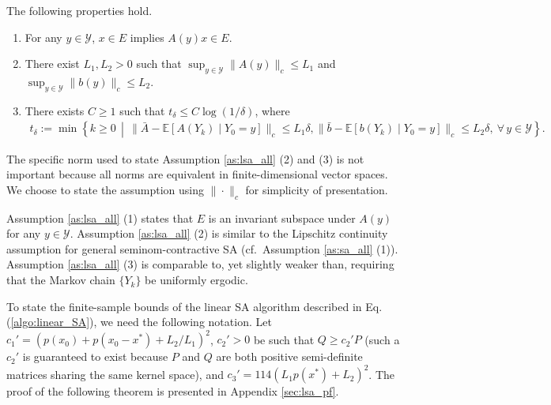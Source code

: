 \documentclass[11 pt]{article}
\begin{document}
	
	\begin{assumption}\label{as:lsa_all}
		The following properties hold.
		\begin{enumerate}[(1)]
			\item For any $y\in\mathcal{Y}$, $x\in E$ implies $A(y)x\in E$.
			\item There exist $L_1,L_2>0$ such that $\sup_{y\in\mathcal{Y}}\|A(y)\|_c\leq L_1$ and $\sup_{y\in\mathcal{Y}}\|b(y)\|_c\leq L_2$.
			\item There exists $C \geq 1$ such that $t_\delta \leq C \log(1/\delta)$, where
			\begin{align*}  
				t_\delta := \min\left\{k \geq 0 \,\middle|\, \|\bar{A} - \mathbb{E}[A(Y_k) \mid Y_0=y]\|_c \leq L_1\delta, \|\bar{b}-\mathbb{E}[b(Y_k)\mid Y_0=y]\|_c \leq L_2\delta,~\forall\,y \in \mathcal{Y}\right\}.
			\end{align*}
		\end{enumerate}
	\end{assumption}
	\begin{remark}
		The specific norm used to state Assumption \ref{as:lsa_all} (2) and (3) is not important because all norms are equivalent in finite-dimensional vector spaces. We choose to state the assumption using $\|\cdot\|_c$ for simplicity of presentation.
	\end{remark}
	
	
	Assumption \ref{as:lsa_all} (1) states that $E$ is an invariant subspace under $A(y)$ for any $y\in\mathcal{Y}$. Assumption \ref{as:lsa_all} (2) is similar to the Lipschitz continuity assumption for general seminom-contractive SA (cf.\ Assumption \ref{as:sa_all} (1)). Assumption \ref{as:lsa_all} (3) is comparable to, yet slightly weaker than, requiring that the Markov chain $\{Y_k\}$ be uniformly ergodic. 
	
	To state the finite-sample bounds of the linear SA algorithm described in Eq. (\ref{algo:linear_SA}), we need the following notation. Let $c_1'=(p(x_0)+p(x_0-x^*)+L_2/L_1)^2$,
	$c_2'>0$ be such that $Q\geq c_2'P$ (such a $c_2'$ is guaranteed to exist because $P$ and $Q$ are both positive semi-definite matrices sharing the same kernel space), and $c_3'=114(L_1p(x^*)+L_2)^2$. The proof of the following theorem is presented in Appendix \ref{sec:lsa_pf}. 
	
\end{document}
